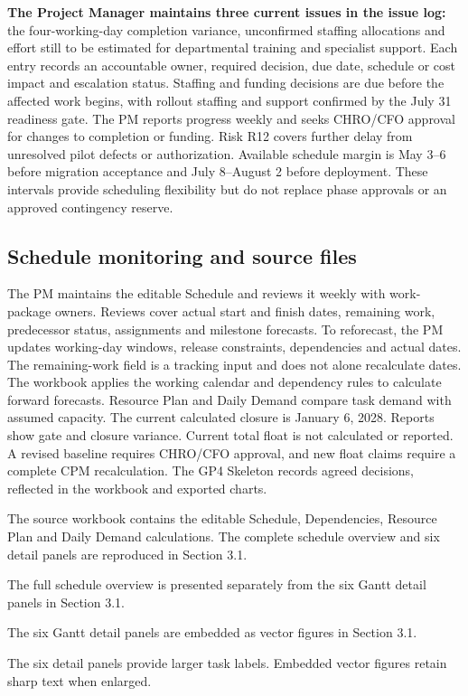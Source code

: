 \textbf{The Project Manager maintains three current issues in the issue log:} the four-working-day completion variance, unconfirmed staffing allocations and effort still to be estimated for departmental training and specialist support. Each entry records an accountable owner, required decision, due date, schedule or cost impact and escalation status. Staffing and funding decisions are due before the affected work begins, with rollout staffing and support confirmed by the July 31 readiness gate. The PM reports progress weekly and seeks CHRO/\allowbreak{}CFO approval for changes to completion or funding. Risk R12 covers further delay from unresolved pilot defects or authorization. Available schedule margin is May 3--6 before migration acceptance and July 8--August 2 before deployment. These intervals provide scheduling flexibility but do not replace phase approvals or an approved contingency reserve.


\subsection{Schedule monitoring and source files}\label{sec:3.8}
The PM maintains the editable Schedule and reviews it weekly with work-package owners. Reviews cover actual start and finish dates, remaining work, predecessor status, assignments and milestone forecasts. To reforecast, the PM updates working-day windows, release constraints, dependencies and actual dates. The remaining-work field is a tracking input and does not alone recalculate dates. The workbook applies the working calendar and dependency rules to calculate forward forecasts. Resource Plan and Daily Demand compare task demand with assumed capacity. The current calculated closure is January 6, 2028. Reports show gate and closure variance. Current total float is not calculated or reported. A revised baseline requires CHRO/\allowbreak{}CFO approval, and new float claims require a complete CPM recalculation. The GP4 Skeleton records agreed decisions, reflected in the workbook and exported charts.


The source workbook contains the editable Schedule, Dependencies, Resource Plan and Daily Demand calculations. The complete schedule overview and six detail panels are reproduced in Section 3.1.


The full schedule overview is presented separately from the six Gantt detail panels in Section 3.1.


The six Gantt detail panels are embedded as vector figures in Section 3.1.


The six detail panels provide larger task labels. Embedded vector figures retain sharp text when enlarged.
